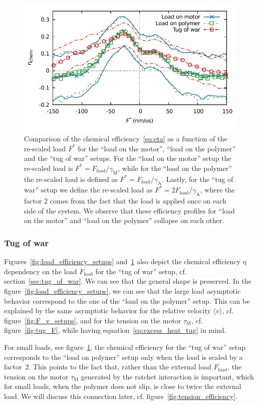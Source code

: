 \documentclass[aps,pre,twocolumn,showpacs,showkeys,superscriptaddress,floatfix]{revtex4-1}
\begin{document}
\begin{figure}[t]
\centering
\includegraphics[width=.45\textwidth,height=!]{F_eta_setup_rescaled.pdf}
\caption{\label{fig:load_efficiency_setups_rescaled}
Comparison of the chemical efficiency~\eqref{eq:eta} as a function of the re-scaled load $F^*$ for the ``load on the motor'', ``load on the polymer'' and the ``tug of war'' setups.
For the ``load on the motor'' setup the re-scaled load is $F^* = F_\text{load} / \gamma_\text{M}$, 
while for the ``load on the polymer'' the re-scaled load is defined as $F^* = F_\text{load} / \gamma_\text{A}$.
Lastly, for the ``tug of war'' setup we define the re-scaled load as $F^* = 2 F_\text{load} / \gamma_\text{A}$,
where the factor $2$ comes from the fact that the load is applied once on each side of the system.
We observe that these efficiency profiles for ``load on the motor'' and ``load on the polymer'' collapse on each other.    
}
\end{figure}


\subsubsection{Tug of war}
Figures~\ref{fig:load_efficiency_setups} and~\ref{fig:load_efficiency_setups_rescaled} also depict the chemical efficiency $\eta$ dependency on the load $F_\text{load}$ for the ``tug of war'' setup, cf. section~\ref{sec:tug_of_war}.
We can see that the general shape is preserved.
In the figure~\ref{fig:load_efficiency_setups}, we can see that the large load asymptotic behavior correspond to the one of the ``load on the polymer'' setup.
This can be explained by the same asymptotic behavior for the relative velocity $\langle v\rangle$, cf. figure~\ref{fig:F_v_setups}, 
and for the tension on the motor $\tau_\text{M}$, cf. figure~\ref{fig:tug_F}, while having equation~\eqref{eq:excess_heat_tug} in mind.

For small loads, see figure~\ref{fig:load_efficiency_setups_rescaled}, the chemical efficiency for the ``tug of war'' setup corresponds to the ``load on polymer'' setup only when the load is scaled by a factor~$2$. 
This points to the fact that, rather than the external load $F_\text{load}$, the tension on the motor $\tau_\text{M}$ generated by the ratchet interaction is important,
which for small loads, when the polymer does not slip, is close to twice the external load. 
We will discuss this connection later, cf. figure~\ref{fig:tension_efficiency}. 
\end{document}
